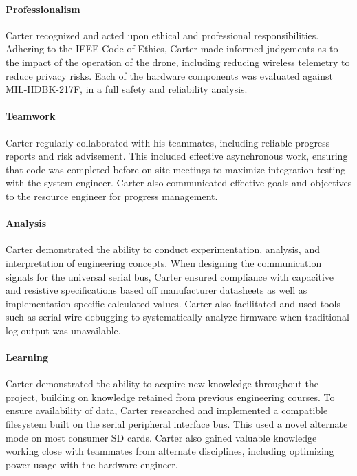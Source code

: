 \documentclass[../../main.tex]{subfiles}
\begin{document}
\paragraph{Professionalism} Carter recognized and acted upon ethical and professional responsibilities. Adhering to the IEEE Code of Ethics, Carter made informed judgements as to the impact of the operation of the drone, including reducing wireless telemetry to reduce privacy risks. Each of the hardware components was evaluated against MIL-HDBK-217F, in a full safety and reliability analysis.


\paragraph{Teamwork}
Carter regularly collaborated with his teammates, including reliable progress reports and risk advisement. This included effective asynchronous work, ensuring that code was completed before on-site meetings to maximize integration testing with the system engineer. Carter also communicated effective goals and objectives to the resource engineer for progress management.


\paragraph{Analysis} Carter demonstrated the ability to conduct experimentation, analysis, and interpretation of engineering concepts. When designing the communication signals for the universal serial bus, Carter ensured compliance with capacitive and resistive specifications based off manufacturer datasheets as well as implementation-specific calculated values. Carter also facilitated and used tools such as serial-wire debugging to systematically analyze firmware when traditional log output was unavailable.


\paragraph{Learning} Carter demonstrated the ability to acquire new knowledge throughout the project, building on knowledge retained from previous engineering courses. To ensure availability of data, Carter researched and implemented a compatible filesystem built on the serial peripheral interface bus. This used a novel alternate mode on most consumer SD cards. Carter also gained valuable knowledge working close with teammates from alternate disciplines, including optimizing power usage with the hardware engineer.
\end{document}
